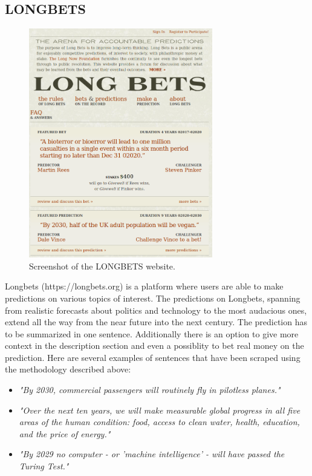 \documentclass[a4paper,12pt]{report} %
\begin{document}
\subsection{LONGBETS}
\begin{figure}
  \centering
  \includegraphics[height=10cm]{img/longbets.png}
  \caption{Screenshot of the LONGBETS website.}
  \label{fig:longbets}
\end{figure}
Longbets (https://longbets.org) is a platform where users are able to make predictions on various topics of interest.
The predictions on Longbets, spanning from realistic forecasts about politics and technology to the most audacious ones, extend all the way from the near future into the next century.
The prediction has to be summarized in one sentence. Additionally there is an option to give more context in the description section and even a possiblity to bet real money on the prediction.      
Here are several examples of sentences that have been scraped using the methodology described above:
\begin{itemize}
  \item \textit{"By 2030, commercial passengers will routinely fly in pilotless planes."}
  \item \textit{"Over the next ten years, we will make measurable global progress in all five areas of the human condition: food, access to clean water, health, education, and the price of energy."}
  \item \textit{"By 2029 no computer - or 'machine intelligence' - will have passed the Turing Test."}
\end{itemize}
    
\end{document}
